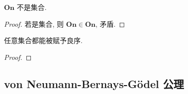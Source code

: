 \begin{lemma}
    \label{lemma:On is not a set}
    \(\mathbf{On}\) 不是集合.

    \begin{proof}
        若是集合, 则 \(\mathbf{On} \in \mathbf{On}\), 矛盾.
    \end{proof}
\end{lemma}

\begin{theorem*}
     \label{theorem:well-ordering theorem}
    任意集合都能被赋予良序.

    \begin{proof}
        
    \end{proof}
\end{theorem*}

\subsection{von Neumann-Bernays-Gödel 公理}
